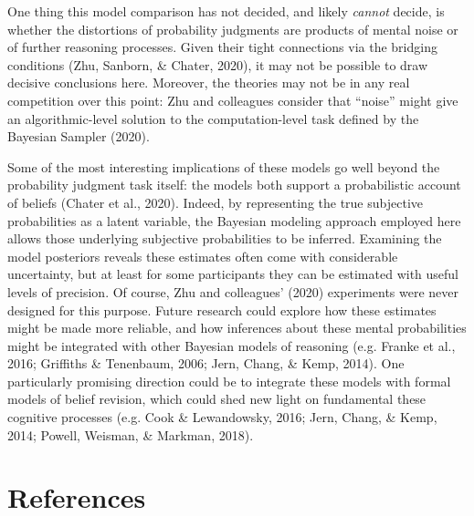 \documentclass[
  english,
  man,floatsintext]{apa6}
\begin{document}
One thing this model comparison has not decided, and likely \emph{cannot} decide, is whether the distortions of probability judgments are products of mental noise or of further reasoning processes. Given their tight connections via the bridging conditions (Zhu, Sanborn, \& Chater, 2020), it may not be possible to draw decisive conclusions here. Moreover, the theories may not be in any real competition over this point: Zhu and colleagues consider that ``noise'' might give an algorithmic-level solution to the computation-level task defined by the Bayesian Sampler (2020).

Some of the most interesting implications of these models go well beyond the probability judgment task itself: the models both support a probabilistic account of beliefs (Chater et al., 2020). Indeed, by representing the true subjective probabilities as a latent variable, the Bayesian modeling approach employed here allows those underlying subjective probabilities to be inferred. Examining the model posteriors reveals these estimates often come with considerable uncertainty, but at least for some participants they can be estimated with useful levels of precision. Of course, Zhu and colleagues' (2020) experiments were never designed for this purpose. Future research could explore how these estimates might be made more reliable, and how inferences about these mental probabilities might be integrated with other Bayesian models of reasoning (e.g. Franke et al., 2016; Griffiths \& Tenenbaum, 2006; Jern, Chang, \& Kemp, 2014). One particularly promising direction could be to integrate these models with formal models of belief revision, which could shed new light on fundamental these cognitive processes (e.g. Cook \& Lewandowsky, 2016; Jern, Chang, \& Kemp, 2014; Powell, Weisman, \& Markman, 2018).

\newpage

\hypertarget{references}{%
\section*{References}\label{references}}
\end{document}
